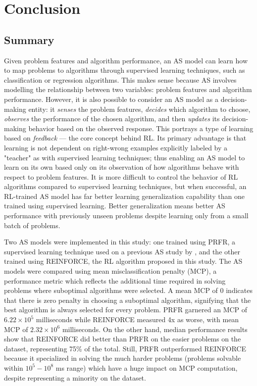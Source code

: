 \chapter{Conclusion}
\section{Summary}
Given problem features and algorithm performance, an AS model can learn how to map problems to algorithms through supervised learning techniques, such as classification or regression algorithms. This makes sense because AS involves modelling the relationship between two variables: problem features and algorithm performance. However, it is also possible to consider an AS model as a decision-making entity: it \textit{senses} the problem features, \textit{decides} which algorithm to choose, \textit{observes} the performance of the chosen algorithm, and then \textit{updates} its decision-making behavior based on the observed response. This portrays a type of learning based on \textit{feedback} --– the core concept behind RL. Its primary advantage is that learning is not dependent on right-wrong examples explicitly labeled by a "teacher" as with supervised learning techniques; thus enabling an AS model to learn on its own based only on its observation of how algorithms behave with respect to problem features. It is more difficult to control the behavior of RL algorithms compared to supervised learning techniques, but when successful, an RL-trained AS model has far better learning generalization capability than one trained using supervised learning. Better generalization means better AS performance with previously unseen problems despite learning only from a small batch of problems.

Two AS models were implemented in this study: one trained using PRFR, a supervised learning technique used on a previous AS study by \citet{kotthoff2016portfolios}, and the other trained using REINFORCE, the RL algorithm proposed in this study. The AS models were compared using mean misclassification penalty (MCP), a performance metric which reflects the additional time required in solving problems where suboptimal algorithms were selected. A mean MCP of 0 indicates that there is zero penalty in choosing a suboptimal algorithm, signifying that the best algorithm is always selected for every problem. PRFR garnered an MCP of $6.22 \times 10^5$ milliseconds while REINFORCE measured 4x as worse, with mean MCP of $2.32 \times 10^{6}$ milliseconds. On the other hand, median performance results show that REINFORCE did better than PRFR on the easier problems on the dataset, representing 75\% of the total. Still, PRFR outperformed REINFORCE because it specialized in solving the much harder problems (problems solvable within $10^5-10^8$ ms range) which have a huge impact on MCP computation, despite representing a minority on the dataset.    


